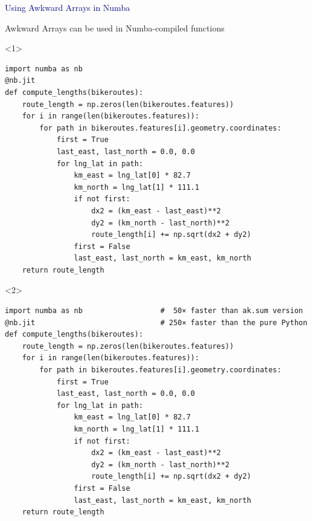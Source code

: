 \documentclass[aspectratio=169]{beamer}
\begin{document}
\begin{frame}{}
\Huge
\vspace{1 cm}
\begin{center}
\textcolor{darkblue}{Using Awkward Arrays in Numba}
\end{center}
\end{frame}

\begin{frame}[fragile]{Awkward Arrays can be used in Numba-compiled functions}
\vspace{0.1 cm}
\small
\begin{onlyenv}<1>
\begin{verbatim}
import numba as nb
@nb.jit
def compute_lengths(bikeroutes):
    route_length = np.zeros(len(bikeroutes.features))
    for i in range(len(bikeroutes.features)):
        for path in bikeroutes.features[i].geometry.coordinates:
            first = True
            last_east, last_north = 0.0, 0.0
            for lng_lat in path:
                km_east = lng_lat[0] * 82.7
                km_north = lng_lat[1] * 111.1
                if not first:
                    dx2 = (km_east - last_east)**2
                    dy2 = (km_north - last_north)**2
                    route_length[i] += np.sqrt(dx2 + dy2)
                first = False
                last_east, last_north = km_east, km_north
    return route_length
\end{verbatim}
\end{onlyenv}\begin{onlyenv}<2>
\begin{verbatim}
import numba as nb                  #  50× faster than ak.sum version
@nb.jit                             # 250× faster than the pure Python
def compute_lengths(bikeroutes):
    route_length = np.zeros(len(bikeroutes.features))
    for i in range(len(bikeroutes.features)):
        for path in bikeroutes.features[i].geometry.coordinates:
            first = True
            last_east, last_north = 0.0, 0.0
            for lng_lat in path:
                km_east = lng_lat[0] * 82.7
                km_north = lng_lat[1] * 111.1
                if not first:
                    dx2 = (km_east - last_east)**2
                    dy2 = (km_north - last_north)**2
                    route_length[i] += np.sqrt(dx2 + dy2)
                first = False
                last_east, last_north = km_east, km_north
    return route_length
\end{verbatim}
\end{onlyenv}
\end{frame}
\end{document}
